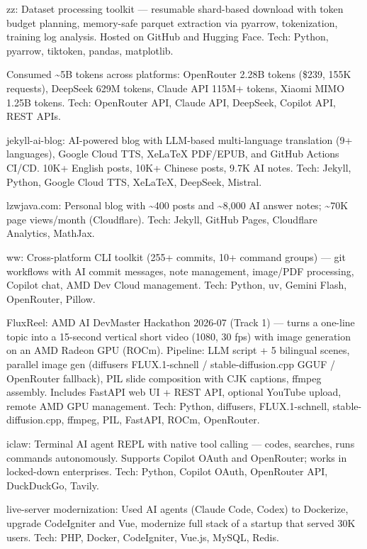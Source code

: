 \begin{cventries}
{\begin{cvitems}
        \item {zz: Dataset processing toolkit — resumable shard-based download with token budget planning, memory-safe parquet extraction via pyarrow, tokenization, training log analysis. Hosted on GitHub and Hugging Face. Tech: Python, pyarrow, tiktoken, pandas, matplotlib.}
        \item {Consumed \textasciitilde5B tokens across platforms: OpenRouter 2.28B tokens (\$239, 155K requests), DeepSeek 629M tokens, Claude API 115M+ tokens, Xiaomi MIMO 1.25B tokens. Tech: OpenRouter API, Claude API, DeepSeek, Copilot API, REST APIs.}
        \item {jekyll-ai-blog: AI-powered blog with LLM-based multi-language translation (9+ languages), Google Cloud TTS, XeLaTeX PDF/EPUB, and GitHub Actions CI/CD. 10K+ English posts, 10K+ Chinese posts, 9.7K AI notes. Tech: Jekyll, Python, Google Cloud TTS, XeLaTeX, DeepSeek, Mistral.}
        \item {lzwjava.com: Personal blog with \textasciitilde400 posts and \textasciitilde8,000 AI answer notes; \textasciitilde70K page views/month (Cloudflare). Tech: Jekyll, GitHub Pages, Cloudflare Analytics, MathJax.}
        \item {ww: Cross-platform CLI toolkit (255+ commits, 10+ command groups) — git workflows with AI commit messages, note management, image/PDF processing, Copilot chat, AMD Dev Cloud management. Tech: Python, uv, Gemini Flash, OpenRouter, Pillow.}
        \item {FluxReel: AMD AI DevMaster Hackathon 2026-07 (Track 1) — turns a one-line topic into a 15-second vertical short video (1080, 30 fps) with image generation on an AMD Radeon GPU (ROCm). Pipeline: LLM script + 5 bilingual scenes, parallel image gen (diffusers FLUX.1-schnell / stable-diffusion.cpp GGUF / OpenRouter fallback), PIL slide composition with CJK captions, ffmpeg assembly. Includes FastAPI web UI + REST API, optional YouTube upload, remote AMD GPU management. Tech: Python, diffusers, FLUX.1-schnell, stable-diffusion.cpp, ffmpeg, PIL, FastAPI, ROCm, OpenRouter.}
        \item {iclaw: Terminal AI agent REPL with native tool calling — codes, searches, runs commands autonomously. Supports Copilot OAuth and OpenRouter; works in locked-down enterprises. Tech: Python, Copilot OAuth, OpenRouter API, DuckDuckGo, Tavily.}
        \item {live-server modernization: Used AI agents (Claude Code, Codex) to Dockerize, upgrade CodeIgniter and Vue, modernize full stack of a startup that served 30K users. Tech: PHP, Docker, CodeIgniter, Vue.js, MySQL, Redis.}
      \end{cvitems}
    }


\end{cventries}
